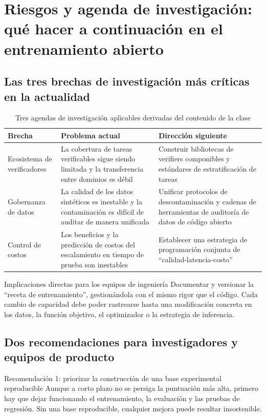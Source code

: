 \section{Riesgos y agenda de investigación: qué hacer a continuación en el entrenamiento abierto}

\subsection{Las tres brechas de investigación más críticas en la actualidad}
\begin{table}[H]
\centering
\renewcommand{\arraystretch}{1.2}
\begin{tabular}{p{3.0cm}p{4.0cm}p{4.2cm}}
\toprule
\textbf{Brecha} & \textbf{Problema actual} & \textbf{Dirección siguiente} \\
\midrule
Ecosistema de verificadores & La cobertura de tareas verificables sigue siendo limitada y la transferencia entre dominios es débil & Construir bibliotecas de verifiers componibles y estándares de estratificación de tareas \\
Gobernanza de datos & La calidad de los datos sintéticos es inestable y la contaminación es difícil de auditar de manera unificada & Unificar protocolos de descontaminación y cadenas de herramientas de auditoría de datos de código abierto \\
Control de costos & Los beneficios y la predicción de costos del escalamiento en tiempo de prueba son inestables & Establecer una estrategia de programación conjunta de ``calidad-latencia-costo'' \\
\bottomrule
\end{tabular}
\caption{Tres agendas de investigación aplicables derivadas del contenido de la clase}
\end{table}

\begin{knowledgebox}{Implicaciones directas para los equipos de ingeniería}
Documentar y versionar la ``receta de entrenamiento'', gestionándola con el mismo rigor que el código. Cada cambio de capacidad debe poder rastrearse hasta una modificación concreta en los datos, la función objetivo, el optimizador o la estrategia de inferencia.
\end{knowledgebox}

\subsection{Dos recomendaciones para investigadores y equipos de producto}
\begin{importantbox}{Recomendación 1: priorizar la construcción de una base experimental reproducible}
Aunque a corto plazo no se persiga la puntuación más alta, primero hay que dejar funcionando el entrenamiento, la evaluación y las pruebas de regresión. Sin una base reproducible, cualquier mejora puede resultar insostenible.
\end{importantbox}

